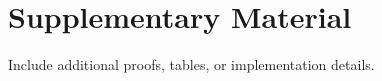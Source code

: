 \chapter{Supplementary Material}
\label{app:supplementary}

Include additional proofs, tables, or implementation details.
